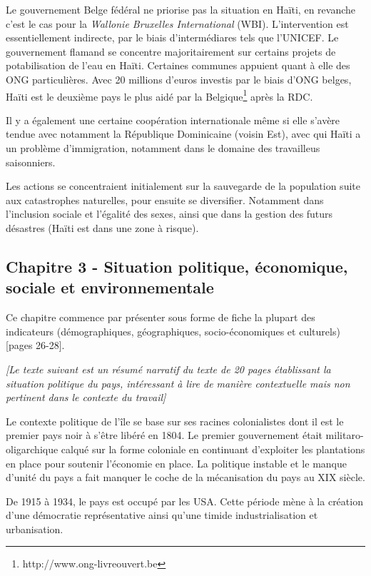 \documentclass[a4paper, 11pt]{article}
\begin{document}
  Le gouvernement Belge fédéral ne priorise pas la situation en Haïti, en revanche c'est le cas pour  la \textit{Wallonie Bruxelles International} (WBI). L'intervention est essentiellement indirecte, par le biais d'intermédiares tels que l'UNICEF. Le gouvernement flamand se concentre majoritairement sur certains projets de potabilisation de l'eau en Haïti. Certaines communes appuient quant à elle des ONG particulières. Avec 20 millions d'euros investis par le biais d'ONG belges, Haïti est le deuxième pays le plus aidé par la Belgique\footnote{http://www.ong-livreouvert.be} après la RDC.

  Il y a également une certaine coopération internationale même si elle s'avère tendue avec notamment la République Dominicaine (voisin Est), avec qui Haïti a un problème d'immigration, notamment dans le domaine des travailleus saisonniers.

  Les actions se concentraient initialement sur la sauvegarde de la population suite aux catastrophes naturelles, pour ensuite se diversifier. Notamment dans l'inclusion sociale et l'égalité des sexes, ainsi que dans la gestion des futurs désastres (Haïti est dans une zone à risque).

  \subsection*{Chapitre 3 - Situation politique, économique, sociale et environnementale}
  Ce chapitre commence par présenter sous forme de fiche la plupart des indicateurs (démographiques, géographiques, socio-économiques et culturels) [pages 26-28].\bigskip

  \textit{[Le texte suivant est un résumé narratif du texte de 20 pages établissant la situation politique du pays, intéressant à lire de manière contextuelle mais non pertinent dans le contexte du travail]}

  Le contexte politique de l'île se base sur ses racines colonialistes dont il est le premier pays noir à s'être libéré en 1804. Le premier gouvernement était militaro-oligarchique calqué sur la forme coloniale en continuant d'exploiter les plantations en place pour soutenir l'économie en place. La politique instable et le manque d'unité du pays a fait manquer le coche de la mécanisation du pays au XIX siècle.

  De 1915 à 1934, le pays est occupé par les USA. Cette période mène à la création d'une démocratie représentative ainsi qu'une timide industrialisation et urbanisation.
\end{document}
